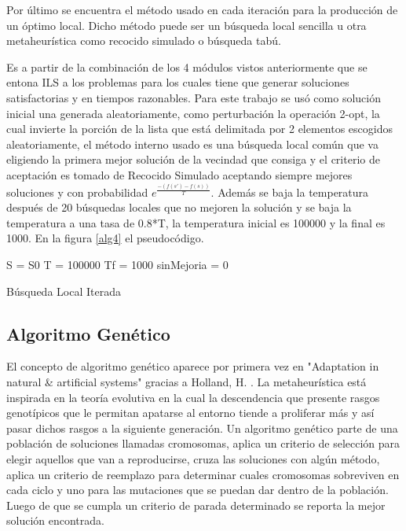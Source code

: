 \documentclass{ci5652}
\begin{document}
Por último se encuentra el método usado en cada iteración para la producción de un óptimo local. Dicho método puede ser un búsqueda local sencilla u otra metaheurística como recocido simulado o búsqueda tabú. 

Es a partir de la combinación de los 4 módulos vistos anteriormente que se entona ILS a los problemas para los cuales tiene que generar soluciones satisfactorias y en tiempos razonables. Para este trabajo se usó como solución inicial una generada aleatoriamente, como perturbación la operación 2-opt, la cual invierte la porción de la lista que está delimitada por 2 elementos escogidos aleatoriamente, el método interno usado es una búsqueda local común que va eligiendo la primera mejor solución de la vecindad que consiga y el criterio de aceptación es tomado de Recocido Simulado aceptando siempre mejores soluciones y con probabilidad $e^{\frac{-(f(s')-f(s))}{T}}$. Además se baja la temperatura después de 20 búsquedas locales que no mejoren la solución y se baja la temperatura a una tasa de 0.8*T, la temperatura inicial es 100000 y la final es 1000. En la figura \ref{alg4} el pseudocódigo.

\begin{algorithm}
 \label{alg4}
 \DontPrintSemicolon
 \vspace*{0.1cm}
 S = S0 
 T = 100000 
 Tf = 1000  
 sinMejoria = 0 \;
 \vspace*{0.1cm}
 \caption{Búsqueda Local Iterada}
\end{algorithm}

\subsection{Algoritmo Genético}

El concepto de algoritmo genético aparece por primera vez en "Adaptation in natural \& artificial systems" gracias a Holland, H. \cite{10}. La metaheurística está inspirada en la teoría evolutiva en la cual la descendencia que presente rasgos genotípicos que le permitan apatarse al entorno tiende a proliferar más y así pasar dichos rasgos a la siguiente generación. Un algoritmo genético parte de una población de soluciones llamadas cromosomas, aplica un criterio de selección para elegir aquellos que van a reproducirse, cruza las soluciones con algún método, aplica un criterio de reemplazo para determinar cuales cromosomas sobreviven en cada ciclo y uno para las mutaciones que se puedan dar dentro de la población. Luego de que se cumpla un criterio de parada determinado se reporta la mejor solución encontrada.
\end{document}
